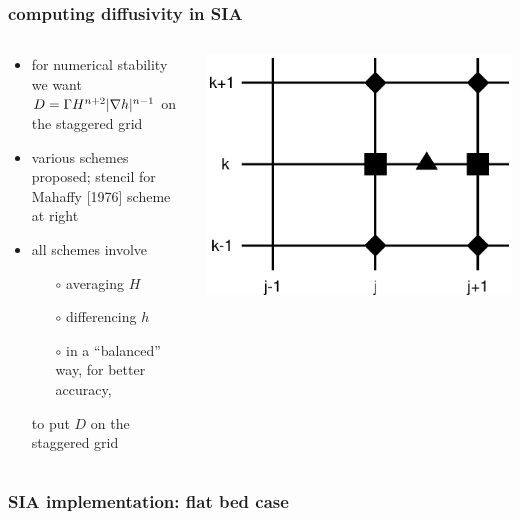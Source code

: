 \begin{frame}
  \frametitle{computing diffusivity in SIA}

\begin{columns}
\begin{column}{0.6\textwidth}
\begin{itemize}
\item for numerical stability we want $D = \Gamma H^{n+2} |\nabla h|^{n-1}$ on the staggered grid
\item various schemes proposed; stencil for Mahaffy [1976]\nocite{Mahaffy} scheme at right
\item all schemes involve
  \begin{itemize}
  \item[$\circ$] averaging $H$
  \item[$\circ$] differencing $h$
  \item[$\circ$] in a ``balanced'' way, for better accuracy,
  \end{itemize}
to put $D$ on the staggered grid
\end{itemize}
\end{column}

\begin{column}{0.4\textwidth}
  \includegraphics[width=1.0\textwidth]{pdffigs/mahaffystencil}
\end{column}
\end{columns}
\end{frame}


\begin{frame}
  \frametitle{SIA implementation: flat bed case}

\end{frame}


